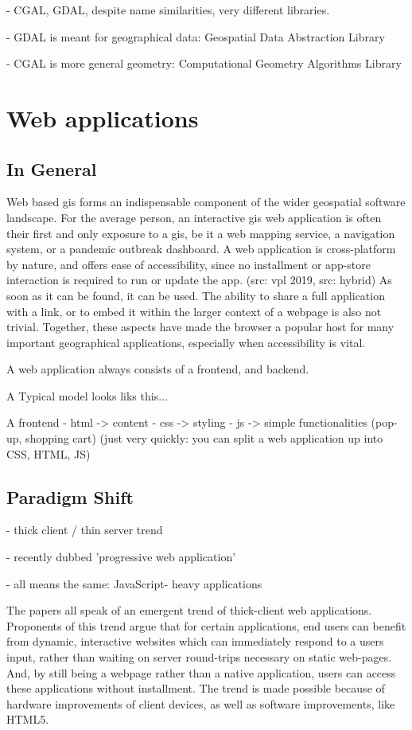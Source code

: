 - CGAL, GDAL, despite name similarities, very different libraries. 

- GDAL is meant for geographical data: Geospatial Data Abstraction Library

- CGAL is more general geometry: Computational Geometry Algorithms Library

\section{Web applications}
\label{sec:background-web}


\subsection{In General}

Web based \ac{gis} forms an indispensable component of the wider geospatial software landscape. 
For the average person, an interactive \ac{gis} web application is often their first and only exposure to a \acs{gis}, be it a web mapping service, a navigation system, or a pandemic outbreak dashboard. 
A web application is cross-platform by nature, and offers ease of accessibility, since no installment or app-store interaction is required to run or update the app. (src: vpl 2019, src: hybrid)
As soon as it can be found, it can be used.
The ability to share a full application with a link, or to embed it within the larger context of a webpage is also not trivial. 
Together, these aspects have made the browser a popular host for many important geographical applications, especially when accessibility is vital.

A web application always consists of a frontend, and backend.

A Typical model looks liks this...

A frontend 
- html -> content 
- css -> styling 
- js -> simple functionalities (pop-up, shopping cart)
(just very quickly: you can split a web application up into CSS, HTML, JS)

\subsection{Paradigm Shift}

- thick client / thin server trend 

- recently dubbed 'progressive web application'

- all means the same: JavaScript- heavy applications


\cite{hamilton_client-side_2014, panidi_hybrid_2015, kulawiak_analysis_2019}
The papers  all speak of an emergent trend of thick-client web applications. 
Proponents of this trend argue that for certain applications, end users can benefit from dynamic, interactive websites which can immediately respond to a users input, rather than waiting on server round-trips necessary on static web-pages. 
And, by still being a webpage rather than a native application, users can access these applications without installment. 
The trend is made possible because of hardware improvements of client devices, as well as software improvements, like HTML5.

